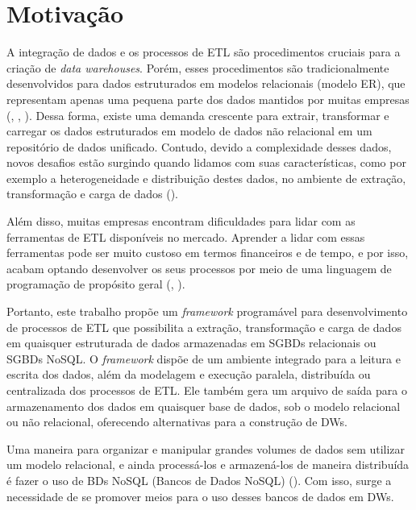 %

\section{Motivação}

A integração de dados e os processos de ETL são procedimentos cruciais para a criação de \textit{data warehouses}. Porém, esses procedimentos são tradicionalmente desenvolvidos para dados estruturados em modelos relacionais (modelo ER), que representam apenas uma pequena parte dos dados mantidos por muitas empresas (\cite{darmont:2005}, \cite{russom:2007}, \cite{thomsen:2009}). Dessa forma, existe uma demanda crescente para extrair, transformar e carregar os dados estruturados em modelo de dados não relacional em um repositório de dados unificado. Contudo, devido a complexidade desses dados, novos desafios estão surgindo quando lidamos com suas características, como por exemplo a heterogeneidade e distribuição destes dados, no ambiente de extração, transformação e carga de dados (\cite{salem:2012}).

Além disso, muitas empresas encontram dificuldades para lidar com as ferramentas de ETL disponíveis no mercado. Aprender a lidar com essas ferramentas pode ser muito custoso em termos financeiros e de tempo, e por isso, acabam optando desenvolver os seus processos por meio de uma linguagem de programação de propósito geral (\cite{awad:2011}, \cite{munoz:2009}).

Portanto, este trabalho propõe um \textit{framework} programável para desenvolvimento de processos de ETL que possibilita a extração, transformação e carga de dados em quaisquer estruturada de dados armazenadas em SGBDs relacionais ou SGBDs NoSQL. O \textit{framework} dispõe de um ambiente integrado para a leitura e escrita dos dados, além da modelagem e execução paralela, distribuída ou centralizada dos processos de ETL. Ele também gera um arquivo de saída para o armazenamento dos dados em quaisquer base de dados, sob o modelo relacional ou não relacional, oferecendo alternativas para a construção de DWs.

Uma maneira para organizar e manipular grandes volumes de dados sem utilizar um modelo relacional, e ainda processá-los e armazená-los de maneira distribuída é fazer o uso de BDs NoSQL (Bancos de Dados NoSQL) (\cite{scabora:2016}). Com isso, surge a necessidade de se promover meios para o uso desses bancos de dados em DWs. 

